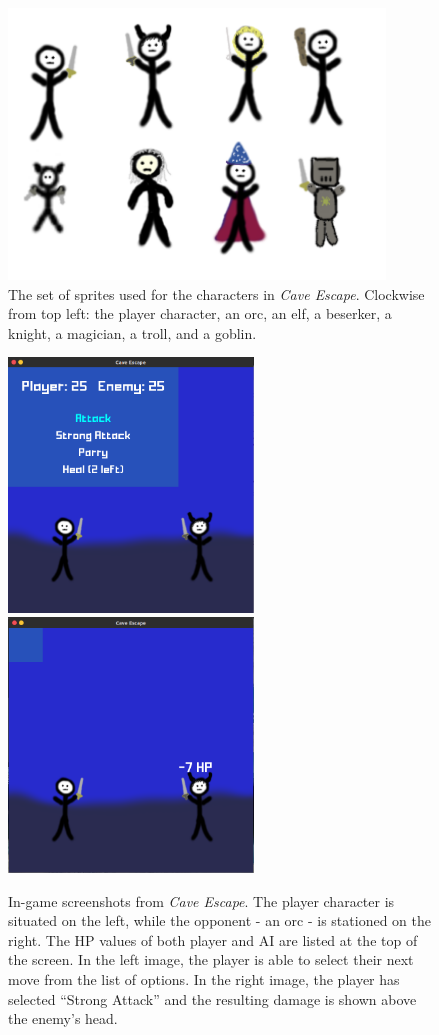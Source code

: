 \begin{figure}[H]
  \centering
  \includegraphics[width=10cm]{sprites/SpriteSheet.png}
  \caption{The set of sprites used for the characters in \textit{Cave Escape}. Clockwise from top left: the player character, an orc, an elf, a beserker, a knight, a magician, a troll, and a goblin.}
  \label{fig:SpriteSheet}
\end{figure}

\begin{figure}[H]
  \centering
  \includegraphics[width=6.5cm]{figures/In-Game.png}
  \includegraphics[width=6.5cm]{figures/In-Game2.png}
  \caption{In-game screenshots from \textit{Cave Escape}. The player character is situated on the left, while the opponent - an orc - is stationed on the right. The HP values of both player and AI are listed at the top of the screen. In the left image, the player is able to select their next move from the list of options. In the right image, the player has selected ``Strong Attack'' and the resulting damage is shown above the enemy's head.}
  \label{fig:ingame}
\end{figure}


